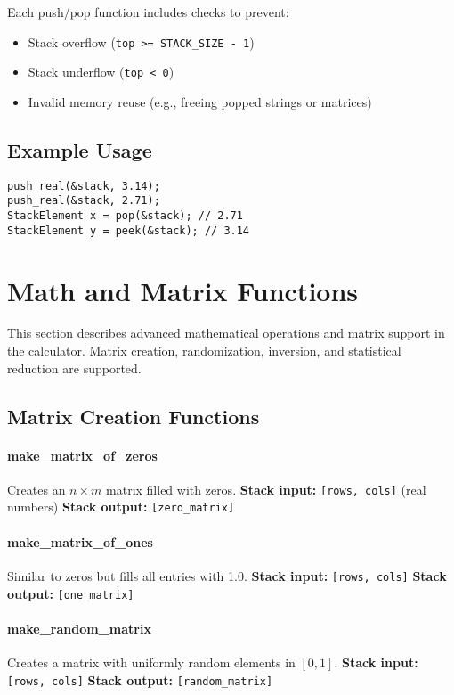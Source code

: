 \documentclass[12pt]{article}
\begin{document}
Each push/pop function includes checks to prevent:
\begin{itemize}
  \item Stack overflow (\texttt{top >= STACK\_SIZE - 1})
  \item Stack underflow (\texttt{top < 0})
  \item Invalid memory reuse (e.g., freeing popped strings or matrices)
\end{itemize}

\subsection{Example Usage}

\begin{verbatim}
push_real(&stack, 3.14);
push_real(&stack, 2.71);
StackElement x = pop(&stack); // 2.71
StackElement y = peek(&stack); // 3.14
\end{verbatim}

\section{Math and Matrix Functions}

This section describes advanced mathematical operations and matrix support in the calculator. Matrix creation, randomization, inversion, and statistical reduction are supported.

\subsection{Matrix Creation Functions}

\paragraph{make\_matrix\_of\_zeros}
Creates an \( n \times m \) matrix filled with zeros.  
\textbf{Stack input:} \texttt{[rows, cols]} (real numbers)  
\textbf{Stack output:} \texttt{[zero\_matrix]}

\paragraph{make\_matrix\_of\_ones}
Similar to zeros but fills all entries with 1.0.  
\textbf{Stack input:} \texttt{[rows, cols]}  
\textbf{Stack output:} \texttt{[one\_matrix]}

\paragraph{make\_random\_matrix}
Creates a matrix with uniformly random elements in \([0,1]\).  
\textbf{Stack input:} \texttt{[rows, cols]}  
\textbf{Stack output:} \texttt{[random\_matrix]}
\end{document}
